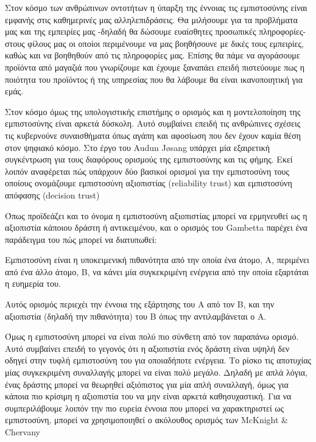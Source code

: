 Στον κόσμο των ανθρώπινων οντοτήτων η ύπαρξη της έννοιας τις εμπιστοσύνης είναι εμφανής στις καθημερινές μας αλληλεπιδράσεις. Θα μιλήσουμε για τα προβλήματα μας και της εμπειρίες μας -δηλαδή θα δώσουμε ευαίσθητες προσωπικές πληροφορίες- στους φίλους μας οι οποίοι περιμένουμε να μας βοηθήσουνε με δικές τους εμπειρίες, καθώς και να βοηθηθούν από τις πληροφορίες μας. Επίσης θα πάμε να αγοράσουμε προϊόντα από μαγαζιά που γνωρίζουμε και έχουμε ξαναπάει επειδή πιστεύουμε πως η ποιότητα του προϊόντος ή της υπηρεσίας που θα λάβουμε θα είναι ικανοποιητική για εμάς.

Στον κόσμο όμως της υπολογιστικής επιστήμης ο ορισμός και η μοντελοποίηση της εμπιστοσύνης είναι αρκετά δύσκολη. Αυτό συμβαίνει επειδή τις ανθρώπινες σχέσεις τις κυβερνούνε συναισθήματα όπως αγάπη και αφοσίωση που δεν έχουν καμία θέση στον ψηφιακό κόσμο. Στο έργο του Audun Jøsang \cite{Josang}
υπάρχει μία εξαιρετική συγκέντρωση για τους διαφόρους ορισμούς της εμπιστοσύνης και τις φήμης.
Εκεί λοιπόν αναφέρεται πώς υπάρχουν δύο βασικοί ορισμοί για την εμπιστοσύνη τους οποίους ονομάζουμε εμπιστοσύνη αξιοπιστίας (reliability trust) και εμπιστοσύνη απόφασης (decision trust)


Όπως προϊδεάζει και το όνομα η εμπιστοσύνη αξιοπιστίας μπορεί να ερμηνευθεί ως η αξιοπιστία κάποιου δράστη ή αντικειμένου, και ο ορισμός του Gambetta \cite{Gambetta}
 παρέχει ένα παράδειγμα του πώς μπορεί να διατυπωθεί:
\begin{reliability}
Εμπιστοσύνη είναι η υποκειμενική πιθανότητα από την οποία ένα άτομο, Α, περιμένει από ένα άλλο άτομο, Β, να κάνει μία συγκεκριμένη ενέργεια από την οποία εξαρτάται η ευημερία του.
\end{reliability}

Αυτός ορισμός περιεχέι την έννοια της εξάρτησης του Α από τον Β, και την αξιοπιστία (δηλαδή την πιθανότητα) του Β όπως την αντιλαμβάνεται ο Α.

Όμως η εμπιστοσύνη μπορεί να είναι πολύ πιο σύνθετη από τον παραπάνω ορισμό. Αυτό συμβαίνει επειδή το γεγονός ότι η αξιοπιστία ενός δράστη είναι υψηλή δεν οδηγεί στην τυφλή εμπιστοσύνη του για οποιαδήποτε ενέργεια. Το ρίσκο τις αποτυχίας μίας συγκεκριμένη συναλλαγής μπορεί να είναι πολύ μεγάλο. Δηλαδή με απλά λόγια, ένας δράστης μπορεί να θεωρηθεί αξιόπιστος για μία απλή συναλλαγή, όμως για κάποια πιο κρίσιμη η αξιοπιστία του να μην είναι αρκετά καθησυχαστική. Για να συμπεριλάβουμε λοιπόν την πιο ευρεία έννοια που μπορεί να χαρακτηριστεί ως εμπιστοσύνη, μπορεί να χρησιμοποιηθεί ο ακόλουθος ορισμός των  McKnight \& Chervany \cite{McKnight}

